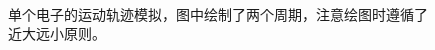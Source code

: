 \documentclass{WHUReport}
\begin{document}
\begin{multicols}{2}
\begin{figure}[H]
		\\
		\caption{单个电子的运动轨迹模拟，图中绘制了两个周期，注意绘图时遵循了近大远小原则。}
	\end{figure}
	

\end{multicols}
\end{document}
